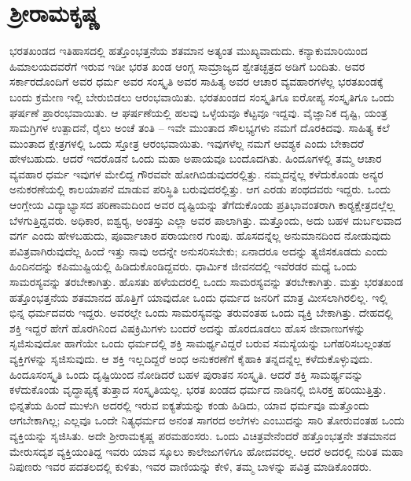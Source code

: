 
\chapter{ಶ‍್ರೀರಾಮಕೃಷ್ಣ}

ಭರತಖಂಡದ ಇತಿಹಾಸದಲ್ಲಿ ಹತ್ತೊಂಭತ್ತನೆಯ ಶತಮಾನ ಅತ್ಯಂತ ಮುಖ್ಯವಾದುದು. ಕನ್ಯಾಕುಮಾರಿಯಿಂದ ಹಿಮಾಲಯದವರೆಗೆ ಇರುವ ಇಡೀ ಭರತ ಖಂಡ ಆಂಗ್ಲ ಸಾಮ್ರಾಜ್ಯದ ಶ್ವೇತಚ್ಛತ್ರದ ಅಡಿಗೆ ಬಂದಿತು. ಅವರ ಸರ್ಕಾರದೊಂದಿಗೆ ಅವರ ಧರ್ಮ ಅವರ ಸಂಸ್ಕೃತಿ ಅವರ ಸಾಹಿತ್ಯ ಅವರ ಆಚಾರ ವ್ಯವಹಾರಗಳೆಲ್ಲ ಭರತಖಂಡಕ್ಕೆ ಬಂದು ಕ್ರಮೇಣ ಇಲ್ಲಿ ಬೇರುಬಿಡಲು ಆರಂಭವಾಯಿತು. ಭರತಖಂಡದ ಸಂಸ್ಕೃತಿಗೂ ಐರೋಪ್ಯ ಸಂಸ್ಕೃತಿಗೂ ಒಂದು ಘರ್ಷಣೆ ಪ್ರಾರಂಭವಾಯಿತು. ಆ ಘರ್ಷಣೆಯಲ್ಲಿ ಹಲವು ಒಳ್ಳೆಯವೂ ಕೆಟ್ಟವೂ ಇದ್ದವು. ವೈಜ್ಞಾನಿಕ ದೃಷ್ಟಿ, ಯಂತ್ರ ಸಾಮಗ್ರಿಗಳ ಉತ್ಪಾದನೆ, ರೈಲು ಅಂಚೆ ತಂತಿ – ಇವೇ ಮುಂತಾದ ಸೌಲಭ್ಯಗಳು ನಮಗೆ ದೊರಕಿದವು. ಸಾಹಿತ್ಯ ಕಲೆ ಮುಂತಾದ ಕ್ಷೇತ್ರಗಳಲ್ಲಿ ಒಂದು ಸ್ತೋತ್ರ ಆರಂಭವಾಯಿತು. ಇವುಗಳೆಲ್ಲ ನಮಗೆ ಆವಶ್ಯಕ ಎಂದು ಬೇಕಾದರೆ ಹೇಳಬಹುದು. ಆದರೆ ಇದರೊಡನೆ ಒಂದು ಮಹಾ ಅಪಾಯವೂ ಬಂದೊದಗಿತು. ಹಿಂದೂಗಳಲ್ಲಿ ತಮ್ಮ ಆಚಾರ ವ್ಯವಹಾರ ಧರ್ಮ ಇವುಗಳ ಮೇಲಿದ್ದ ಗೌರವವೇ ಹೋಗಿಬಿಡುವುದರಲ್ಲಿತ್ತು. ನಮ್ಮದನ್ನೆಲ್ಲ ಕಳೆದುಕೊಂಡು ಅನ್ಯರ ಅನುಕರಣೆಯಲ್ಲಿ ಕಾಲಯಾಪನೆ ಮಾಡುವ ಪರಿಸ್ಥಿತಿ ಬರುವುದರಲ್ಲಿತ್ತು. ಆಗ ಎರಡು ಪಂಥದವರು ಇದ್ದರು. ಒಂದು ಆಂಗ್ಲೇಯ ವಿದ್ಯಾಭ್ಯಾಸದ ಪರಿಣಾಮದಿಂದ ಅವರ ದೃಷ್ಟಿಯನ್ನು ತೆಗೆದುಕೊಂಡು ಪ್ರತಿಭಾವಂತರಾಗಿ ಕಾರ‍್ಯಕ್ಷೇತ್ರದಲ್ಲೆಲ್ಲ ಬೆಳಗುತ್ತಿದ್ದವರು. ಅಧಿಕಾರ, ಐಶ್ವರ‍್ಯ, ಅಂತಸ್ತು ಎಲ್ಲಾ ಅವರ ಪಾಲಾಗಿತ್ತು. ಮತ್ತೊಂದು, ಅದು ಬಹಳ ದುರ್ಬಲವಾದ ವರ್ಗ ಎಂದು ಹೇಳಬಹುದು, ಪೂರ್ವಾಚಾರ ಪರಾಯಣರ ಗುಂಪು. ಹೊಸದನ್ನೆಲ್ಲ ಅನುಮಾನದಿಂದ ನೋಡುವುದು ಪವಿತ್ರವಾಗಿರುವುದೆಲ್ಲ ಹಿಂದೆ ಇತ್ತು ನಾವು ಅದನ್ನೇ ಅನುಸರಿಸಬೇಕು; ಏನಾದರೂ ಅದನ್ನು ತ್ಯಜಿಸಕೂಡದು ಎಂದು ಹಿಂದಿನದನ್ನು ಕಪಿಮುಷ್ಟಿಯಲ್ಲಿ ಹಿಡಿದುಕೊಂಡಿದ್ದವರು. ಧಾರ್ಮಿಕ ಜೀವನದಲ್ಲಿ ಇವೆರಡರ ಮಧ್ಯೆ ಒಂದು ಸಾಮರಸ್ಯವನ್ನು ತರಬೇಕಾಗಿತ್ತು. ಹೊಸತು ಹಳೆಯದರಲ್ಲಿ ಒಂದು ಸಾಮರಸ್ಯವನ್ನು ತರಬೇಕಾಗಿತ್ತು. ಮತ್ತು ಭರತಖಂಡ ಹತ್ತೊಂಭತ್ತನೆಯ ಶತಮಾನದ ಹೊತ್ತಿಗೆ ಯಾವುದೋ ಒಂದು ಧರ್ಮದ ಜನರಿಗೆ ಮಾತ್ರ ಮೀಸಲಾಗಿರಲಿಲ್ಲ. ಇಲ್ಲಿ ಭಿನ್ನ ಧರ್ಮದವರು ಇದ್ದರು. ಅವರಲ್ಲೇ ಒಂದು ಸಾಮರಸ್ಯವನ್ನು ತರುವಂತಹ ಒಂದು ವ್ಯಕ್ತಿ ಬೇಕಾಗಿತ್ತು. ದೇಹದಲ್ಲಿ ಶಕ್ತಿ ಇದ್ದರೆ ಹೇಗೆ ಹೊರಗಿನಿಂದ ವಿಷಕ್ರಿಮಿಗಳು ಬಂದರೆ ಅದನ್ನು ಹೊರದೂಡಲು ಹೊಸ ಜೀವಾಣುಗಳನ್ನು ಸೃಜಿಸುವುದೋ ಹಾಗೆಯೇ ಒಂದು ಧರ್ಮದಲ್ಲಿ ಶಕ್ತಿ ಸಾಮರ್ಥ್ಯವಿದ್ದರೆ ಬರುವ ಸಮಸ್ಯೆಯನ್ನು ಬಗೆಹರಿಸಬಲ್ಲಂತಹ ವ್ಯಕ್ತಿಗಳನ್ನು ಸೃಜಿಸುವುದು. ಆ ಶಕ್ತಿ ಇಲ್ಲದಿದ್ದರೆ ಅಂಧ ಅನುಕರಣೆಗೆ ಕೈಹಾಕಿ ತನ್ನದನ್ನೆಲ್ಲ ಕಳೆದುಕೊಳ್ಳುವುದು. ಹಿಂದೂಸಂಸ್ಕೃತಿ ಒಂದು ದೃಷ್ಟಿಯಿಂದ ನೋಡಿದರೆ ಬಹಳ ಪುರಾತನ ಸಂಸ್ಕೃತಿ. ಆದರೆ ಶಕ್ತಿ ಸಾಮರ್ಥ್ಯವನ್ನು ಕಳೆದುಕೊಂಡು ವೃದ್ಧಾಪ್ಯಕ್ಕೆ ತುತ್ತಾದ ಸಂಸ್ಕೃತಿಯಲ್ಲ. ಭರತ ಖಂಡದ ಧರ್ಮದ ನಾಡಿನಲ್ಲಿ ಬಿಸಿರಕ್ತ ಹರಿಯುತ್ತಿತ್ತು. ಭಿನ್ನತೆಯ ಹಿಂದೆ ಮುಳುಗಿ ಅದರಲ್ಲಿ ಇರುವ ಐಕ್ಯತೆಯನ್ನು ಕಂಡು ಹಿಡಿದು, ಯಾವ ಧರ್ಮವೂ ಮತ್ತೊಂದು ಆಗಬೇಕಾಗಿಲ್ಲ; ಎಲ್ಲವೂ ಒಂದೇ ನಿತ್ಯಧರ್ಮದ ಅನಂತ ಸಾಗರದ ಅಲೆಗಳು ಎಂಬುದನ್ನು ಸಾರಿ ತೋರುವಂತಹ ಒಂದು ವ್ಯಕ್ತಿಯನ್ನು ಸೃಜಿಸಿತು. ಅದೇ ಶ‍್ರೀರಾಮಕೃಷ್ಣ ಪರಮಹಂಸರು. ಒಂದು ವಿಚಿತ್ರವೇನೆಂದರೆ ಹತ್ತೊಂಭತ್ತನೇ ಶತಮಾನದ ಮೇರುಸದೃಶ ವ್ಯಕ್ತಿಯಂತಿದ್ದ ಇವರು ಯಾವ ಸ್ಕೂಲು ಕಾಲೇಜುಗಳಿಗೂ ಹೋದವರಲ್ಲ. ಆದರೆ ಅದರಲ್ಲಿ ನುರಿತ ಮಹಾ ನಿಪುಣರು ಇವರ ಪದತಲದಲ್ಲಿ ಕುಳಿತು, ಇವರ ವಾಣಿಯನ್ನು ಕೇಳಿ, ತಮ್ಮ ಬಾಳನ್ನು ಪವಿತ್ರ ಮಾಡಿಕೊಂಡರು.

